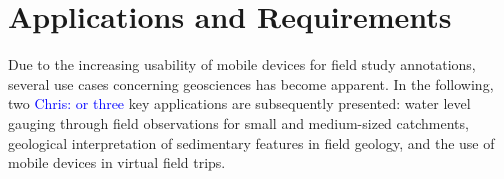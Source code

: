 \documentclass[review]{elsarticle}
\begin{document}

\section{Applications and Requirements}
\label{sec:applications}
Due to the increasing usability of mobile devices for field study annotations, several use cases concerning geosciences has become apparent. In the following, two \textcolor{blue}{Chris: or three} key applications are subsequently presented: water level gauging through field observations for small and medium-sized catchments, geological interpretation of sedimentary features in field geology, and the use of mobile devices in virtual field trips.
\end{document}
